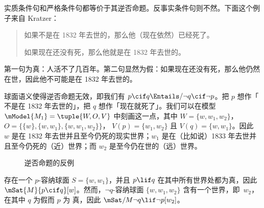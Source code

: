 \documentclass[../../../include/open-logic-section]{subfiles}
\begin{document}


实质条件句和严格条件句都等价于其逆否命题。反事实条件句则不然。下面这个例子来自 Kratzer：
\begin{quote}
  如果不是在 1832 年去世的，那么他（现在依然）已经死了。

  如果现在还没有死，那么他就是在 1832 年去世的。
\end{quote}
第一句为真：人活不了几百年。第二句显然为假：如果现在还没有死，那么他仍然在世，因此他不可能是在 1832 年去世的。

\begin{ex}
  球面语义使得逆否命题无效，即我们有 $p
  \cif q \Entails/ \lnot q \cif \lnot p$。把 $p$ 想作「
  不是在 1832 年去世的」，把 $q$ 想作「现在就死了」。我们可以在模型 $\mModel{M_1} = \tuple{W, O, V}$ 中刻画这一点，其中 $W =
  \{w, w_1, w_2\}$，$O = \{\{w\}, \{w, w_1\}, \{w, w_1, w_2\}\}$，
  $V(p) = \{w_1, w_2\}$ 且 $V(q) = \{w, w_1\}$。因此 $w$ 是在 1832 年去世并且至今仍死的现实世界；$w_1$ 是在（比如说）1833 年去世并且至今仍死的（近）世界；而 $w_2$ 是至今仍在世的（远）世界。
\begin{figure}
\begin{center}
\caption{逆否命题的反例}
\end{center}
\end{figure}
存在一个 $p$-容纳球面 $S =
\{w, w_1\}$，并且 $p \lif q$ 在其中所有世界处都为真，因此 $\mSat{M}{p
  \cif q}[w]$。然而，$\lnot q$-容纳球面 $\{w, w_1,
w_2\}$ 含有一个世界，即~$w_2$，在其中 $q$ 为假而 $p$ 为
真，因此 $\mSat/{M}{\lnot q \lif \lnot p}[w_2]$。
\end{ex}
\end{document}
